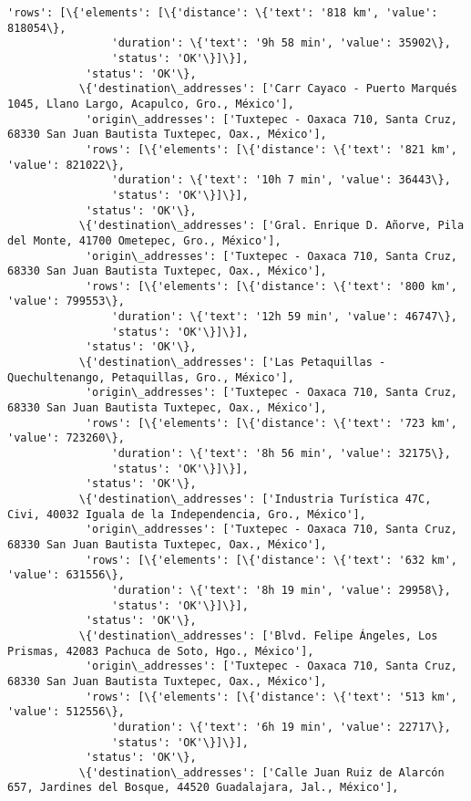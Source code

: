 \documentclass[11pt]{article}
\begin{document}
\begin{Verbatim}[commandchars=\\\{\}]
            'rows': [\{'elements': [\{'distance': \{'text': '818 km', 'value': 818054\},
                'duration': \{'text': '9h 58 min', 'value': 35902\},
                'status': 'OK'\}]\}],
            'status': 'OK'\},
           \{'destination\_addresses': ['Carr Cayaco - Puerto Marqués 1045, Llano Largo, Acapulco, Gro., México'],
            'origin\_addresses': ['Tuxtepec - Oaxaca 710, Santa Cruz, 68330 San Juan Bautista Tuxtepec, Oax., México'],
            'rows': [\{'elements': [\{'distance': \{'text': '821 km', 'value': 821022\},
                'duration': \{'text': '10h 7 min', 'value': 36443\},
                'status': 'OK'\}]\}],
            'status': 'OK'\},
           \{'destination\_addresses': ['Gral. Enrique D. Añorve, Pila del Monte, 41700 Ometepec, Gro., México'],
            'origin\_addresses': ['Tuxtepec - Oaxaca 710, Santa Cruz, 68330 San Juan Bautista Tuxtepec, Oax., México'],
            'rows': [\{'elements': [\{'distance': \{'text': '800 km', 'value': 799553\},
                'duration': \{'text': '12h 59 min', 'value': 46747\},
                'status': 'OK'\}]\}],
            'status': 'OK'\},
           \{'destination\_addresses': ['Las Petaquillas - Quechultenango, Petaquillas, Gro., México'],
            'origin\_addresses': ['Tuxtepec - Oaxaca 710, Santa Cruz, 68330 San Juan Bautista Tuxtepec, Oax., México'],
            'rows': [\{'elements': [\{'distance': \{'text': '723 km', 'value': 723260\},
                'duration': \{'text': '8h 56 min', 'value': 32175\},
                'status': 'OK'\}]\}],
            'status': 'OK'\},
           \{'destination\_addresses': ['Industria Turística 47C, Civi, 40032 Iguala de la Independencia, Gro., México'],
            'origin\_addresses': ['Tuxtepec - Oaxaca 710, Santa Cruz, 68330 San Juan Bautista Tuxtepec, Oax., México'],
            'rows': [\{'elements': [\{'distance': \{'text': '632 km', 'value': 631556\},
                'duration': \{'text': '8h 19 min', 'value': 29958\},
                'status': 'OK'\}]\}],
            'status': 'OK'\},
           \{'destination\_addresses': ['Blvd. Felipe Ángeles, Los Prismas, 42083 Pachuca de Soto, Hgo., México'],
            'origin\_addresses': ['Tuxtepec - Oaxaca 710, Santa Cruz, 68330 San Juan Bautista Tuxtepec, Oax., México'],
            'rows': [\{'elements': [\{'distance': \{'text': '513 km', 'value': 512556\},
                'duration': \{'text': '6h 19 min', 'value': 22717\},
                'status': 'OK'\}]\}],
            'status': 'OK'\},
           \{'destination\_addresses': ['Calle Juan Ruiz de Alarcón 657, Jardines del Bosque, 44520 Guadalajara, Jal., México'],

\end{Verbatim}
\end{document}
